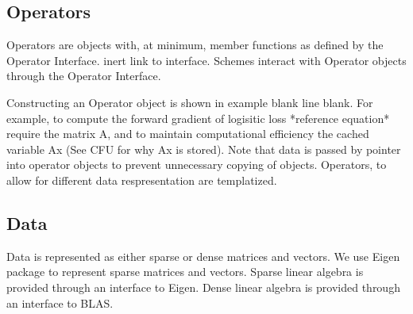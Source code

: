 \subsection{Operators}

Operators are objects with, at minimum, member functions as defined by the Operator Interface.
inert link to interface.
Schemes interact with Operator objects through the Operator Interface.

Constructing an Operator object is shown in example blank line blank.
For example, to compute the forward gradient of logisitic loss *reference equation* require the matrix A, and to maintain computational efficiency the cached variable Ax (See CFU for why Ax is stored). Note that data is passed by pointer into operator objects to prevent unnecessary copying of objects.  
Operators, to allow for different data respresentation are templatized.

\subsection{Data}

Data is represented as either sparse or dense matrices and vectors.
We use Eigen package to represent sparse matrices and vectors. 
Sparse linear algebra is provided through an interface to Eigen.
Dense linear algebra is provided through an interface to BLAS. 





